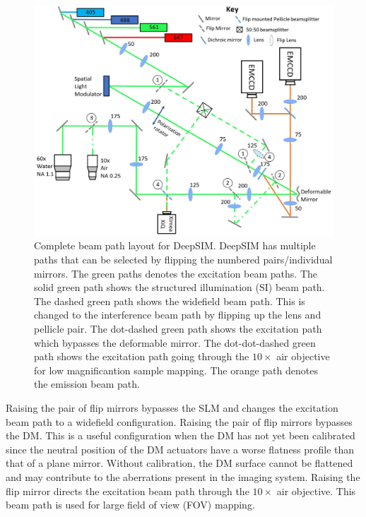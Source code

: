 \begin{figure}[h]
	\centering
	\includegraphics[width=\textwidth]{images/DeepSIM_complete_beam_paths.jpg}
	\caption{Complete beam path layout for DeepSIM. DeepSIM has multiple paths that can be selected by flipping the numbered pairs/individual mirrors. The green paths denotes the excitation beam paths. The solid green path shows the structured illumination (SI) beam path. The dashed green path shows the widefield beam path. This is changed to the interference beam path by flipping up the lens and pellicle pair. The dot-dashed green path shows the excitation path which bypasses the deformable mirror. The dot-dot-dashed green path shows the excitation path going through the $10\times$ air objective for low magnificantion sample mapping. The orange path denotes the emission beam path.}
\label{fig:DeepSIM_complete_beam_paths}
\end{figure}

Raising the  pair of flip mirrors bypasses the SLM and changes the excitation beam path to a widefield configuration. Raising the  pair of flip mirrors bypasses the DM. This is a useful configuration when the DM has not yet been calibrated since the neutral position of the DM actuators have a worse flatness profile than that of a plane mirror. Without calibration, the DM surface cannot be flattened and may contribute to the aberrations present in the imaging system. Raising the  flip mirror directs the excitation beam path through the $10 \times$ air objective. This beam path is used for large field of view (FOV) mapping.

